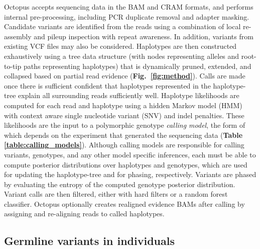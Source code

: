 \documentclass[notitlepage, twocolumn, 10pt]{article}
\begin{document}
Octopus accepts sequencing data in the BAM and CRAM formats, and performs internal pre-processing, including PCR duplicate removal and adapter masking. Candidate variants are identified from the reads using a combination of local re-assembly and pileup inspection with repeat awareness. In addition, variants from existing VCF files may also be considered. Haplotypes are then constructed exhaustively using a tree data structure (with nodes representing alleles and root-to-tip paths representing haplotypes) that is dynamically pruned, extended, and collapsed based on partial read evidence (\textbf{Fig.\ \ref{fig:method}}). Calls are made once there is sufficient confident that haplotypes represented in the haplotype-tree explain all surrounding reads sufficiently well. Haplotype likelihoods are computed for each read and haplotype using a hidden Markov model (HMM) with context aware single nucleotide variant (SNV) and indel penalties. These likelihoods are the input to a polymorphic genotype \emph{calling model}, the form of which depends on the experiment that generated the sequencing data (\textbf{Table \ref{table:calling_models}}). Although calling models are responsible for calling variants, genotypes, and any other model specific inferences, each must be able to compute posterior distributions over haplotypes and genotypes, which are used for updating the haplotype-tree and for phasing, respectively. Variants are phased by evaluating the entropy of the computed genotype posterior distribution. Variant calls are then filtered, either with hard filters or a random forest classifier. Octopus optionally creates realigned evidence BAMs after calling by assigning and re-aligning reads to called haplotypes.

\subsection*{Germline variants in individuals}
\end{document}
